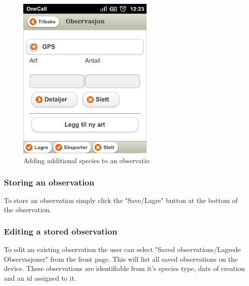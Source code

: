 \begin{figure}[h!]
\centering
 \includegraphics[width=0.6\textwidth,height=0.6\textwidth]{appendix/pic/nyart.jpg} 
 \caption{Adding additional species to an observatio}
 \end{figure}

\subsubsection{Storing an observation}
To store an observation simply click the "Save/Lagre" button at the bottom of the observation.


\pagebreak

\subsubsection{Editing a stored observation}
To edit an existing observation the user can select "Saved observations/Lagrede Observasjoner" from the front page. 
This will list all saved observations on the device. 
These observations are identifiable from it's species type, date of creation and an id assigned to it.

